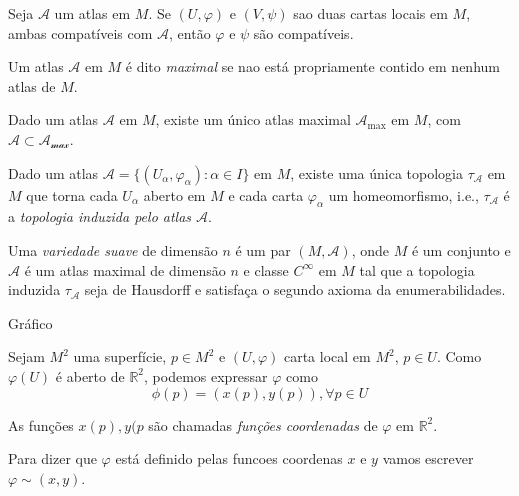 \begin{lema}
	Seja $\mathcal{A}$ um atlas em $M$. Se $(U, \varphi)$ e $(V, \psi)$ sao duas cartas locais em $M$, ambas compatíveis com $\mathcal{A}$, então $\varphi$ e $\psi$ são compatíveis.
\end{lema}

\begin{defi}
	Um atlas $\mathcal{A}$ em $M$ é dito \emph{maximal} se nao está propriamente contido em nenhum atlas de $M$.
\end{defi}

\begin{lema}
	Dado um atlas $\mathcal{A}$ em $M$, existe um único atlas maximal $\mathcal{A}_{\text{max}}$ em $M$, com $\mathcal{A} \subset \mathcal{A_{\text{max}}}$.
\end{lema}

\begin{lema}
	Dado um atlas $\mathcal{A} = \{ (U_{\alpha}, \varphi_{\alpha}): \alpha \in I \}$ em $M$, existe uma única topologia $\tau_{\mathcal{A}}$ em $M$ que torna cada $U_{\alpha}$ aberto em $M$ e cada carta $\varphi_{\alpha}$ um homeomorfismo, i.e., $\tau_{\mathcal{A}}$ é a \emph{topologia induzida pelo atlas $\mathcal{A}$}.
\end{lema}

\begin{defi}
	Uma \emph{variedade suave} de dimensão $n$ é um par $(M, \mathcal{A})$, onde $M$ é um conjunto e $\mathcal{A}$ é um atlas maximal de dimensão $n$ e classe $C^{\infty}$ em $M$ tal que a topologia induzida $\tau_{\mathcal{A}}$ seja de Hausdorff e satisfaça o segundo axioma da enumerabilidades.
\end{defi}

Gráfico

Sejam $M^2$ uma superfície, $p \in M^2$ e $(U, \varphi)$ carta local em $M^2$, $p \in U$. Como $\varphi(U)$ é aberto de $\mathbb{R}^2$, podemos expressar $\varphi$ como
\begin{equation*}
	\phi(p) = (x(p), y(p)), \forall p \in U
\end{equation*}

As funções $x(p), y(p$ são chamadas \emph{funções coordenadas} de $\varphi$ em $\mathbb{R}^2$.

\begin{nota}
	Para dizer que $\varphi$ está definido pelas funcoes coordenas $x$ e $y$ vamos escrever $\varphi \sim  (x,y)$.
\end{nota}


